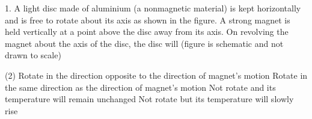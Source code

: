  1. A light disc made of aluminium (a nonmagnetic material) is kept horizontally and is free to rotate about its axis as shown in the figure. A strong magnet is held vertically at a point above the disc away from its axis. On revolving the magnet about the axis of the disc, the disc will (figure is schematic and not drawn to scale)
\begin{tasks}(2)
\task Rotate in the direction opposite to the direction of magnet's motion
\task Rotate in the same direction as the direction of magnet's motion
\task Not rotate and its temperature will remain unchanged
\task Not rotate but its temperature will slowly rise
\end{tasks}